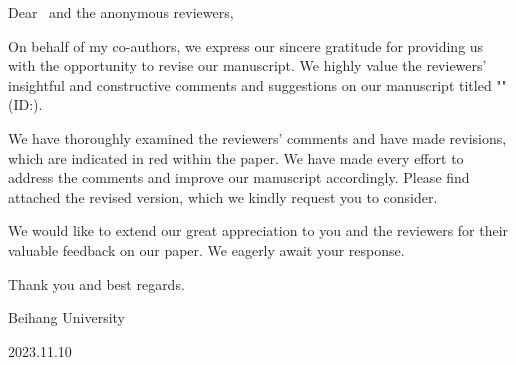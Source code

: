 \noindent Dear \editorname \, and the anonymous reviewers,

On behalf of my co-authors, we express our sincere gratitude for providing us with the opportunity to revise our manuscript. We highly value the reviewers' insightful and constructive comments and suggestions on our manuscript titled "\thetitle" (ID:\manuscript).

We have thoroughly examined the reviewers' comments and have made revisions, which are indicated in red within the paper. We have made every effort to address the comments and improve our manuscript accordingly. Please find attached the revised version, which we kindly request you to consider.

We would like to extend our great appreciation to you and the reviewers for their valuable feedback on our paper. We eagerly await your response.

Thank you and best regards.
\begin{flushright}
\theauthor

Beihang University

2023.11.10
\end{flushright}